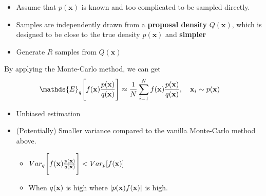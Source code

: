 \begin{itemize}
	\item Assume that $p(\mathbf{x})$ is known and too complicated to be sampled directly. 
	\item Samples are independently drawn from a \textbf{proposal density} $Q(\mathbf{x})$, which is designed to be close to the true density $p(\mathbf{x})$ and \textbf{simpler}
	\item Generate $R$ samples from $Q(\mathbf{x})$
\end{itemize}

By applying the Monte-Carlo method, we can get
\begin{align}
	\mathds{E}_q\Bigg[ f(\mathbf{x}) \frac{p(\mathbf{x})}{q(\rvx)}\Bigg]&
	\approx \frac{1}{N}\sum_{i=1}^N f(\mathbf{x}) \frac{p(\mathbf{x})}{q(\rvx)}, \quad \rvx_i\sim p(\rvx)
	\label{eq:imporatnce_sampling}
\end{align}

\begin{itemize}
	\item Unbiased estimation
	\item (Potentially) Smaller variance compared to the vanilla Monte-Carlo method above.
		\begin{itemize}
			\item $Var_q\Bigg[f(\mathbf{x}) \frac{p(\mathbf{x})}{q({\mathbf{x}})}\Bigg]<Var_p[f({\mathbf{x}})]$
			\item When $q({\mathbf{x}})$ is high where $|p({\mathbf{x}})f({\mathbf{x}})|$ is high.
		\end{itemize}
\end{itemize}

